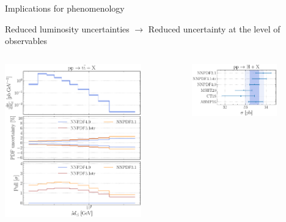 \documentclass[aspectratio=169,9pt]{beamer}
\begin{document}
\begin{frame}[t]{Implications for phenomenology}
    \begin{center}
        Reduced luminosity uncertainties $\rightarrow$ Reduced uncertainty at the level of observables\\
        \vspace*{-0.5em}
        \begin{columns}
	        \begin{column}{0.48\textwidth}
	            \begin{center}
	                \includegraphics[width=0.78\textwidth]{NNPDF_TTB_14TEV_40_PHENO-internal} 
	            \end{center}
	        \end{column}
	        \begin{column}{0.48\textwidth}
	            \includegraphics[width=0.7\textwidth]{NNPDF_H_14TEV_40_PHENO-integrated}\\

\end{column}
\end{columns}
\end{center}
\end{frame}
\end{document}

